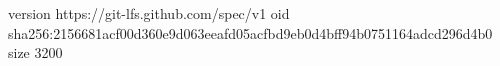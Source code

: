 version https://git-lfs.github.com/spec/v1
oid sha256:2156681acf00d360e9d063eeafd05acfbd9eb0d4bff94b0751164adcd296d4b0
size 3200
